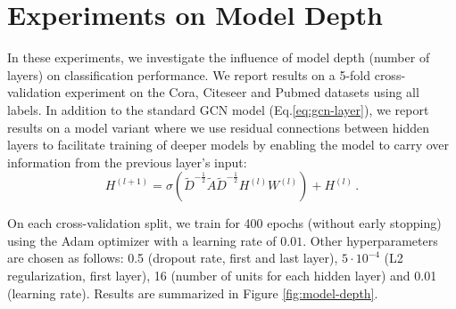 \documentclass{article} %
\makeatletter
\newcommand*{\eq}{Eq.\@\xspace}
\makeatother
\begin{document}
\newpage
\section{Experiments on Model Depth}
\label{sec:depth}
In these experiments, we investigate the influence of model depth (number of layers) on classification performance. We report results on a 5-fold cross-validation experiment on the Cora, Citeseer and Pubmed datasets \citep{sen2008collective} using all labels. In addition to the standard GCN model (\eq \ref{eq:gcn-layer}), we report results on a model variant where we use residual connections \citep{he2015deep} between hidden layers to facilitate training of deeper models by enabling the model to carry over information from the previous layer's input:
\begin{equation}
  \textstyle
  H^{(l+1)}= \sigma\!\left(\tilde{D}^{-\frac{1}{2}} \tilde{A}\tilde{D}^{-\frac{1}{2}}H^{(l)} W^{(l)} \right) + H^{(l)} \, .
\label{eq:gcn-residual-layer}
\end{equation}


On each cross-validation split, we train for 400 epochs (without early stopping) using the Adam optimizer \citep{kingma2014adam} with a learning rate of $0.01$. Other hyperparameters are chosen as follows: 0.5 (dropout rate, first and last layer), $5\cdot 10^{-4}$ (L2 regularization, first layer), 16 (number of units for each hidden layer) and 0.01 (learning rate). Results are summarized in Figure \ref{fig:model-depth}.
\end{document}

